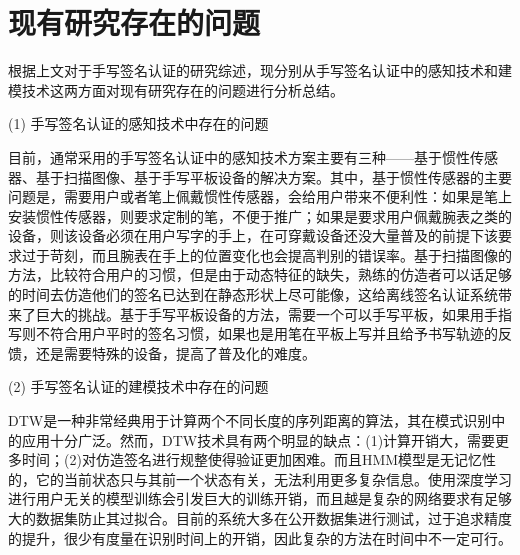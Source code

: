 \section{现有研究存在的问题}
根据上文对于手写签名认证的研究综述，现分别从手写签名认证中的感知技术和建模技术这两方面对现有研究存在的问题进行分析总结。

(1) 手写签名认证的感知技术中存在的问题

目前，通常采用的手写签名认证中的感知技术方案主要有三种——基于惯性传感器、基于扫描图像、基于手写平板设备的解决方案。其中，基于惯性传感器的主要问题是，需要用户或者笔上佩戴惯性传感器，会给用户带来不便利性：如果是笔上安装惯性传感器，则要求定制的笔，不便于推广；如果是要求用户佩戴腕表之类的设备，则该设备必须在用户写字的手上，在可穿戴设备还没大量普及的前提下该要求过于苛刻，而且腕表在手上的位置变化也会提高判别的错误率。基于扫描图像的方法，比较符合用户的习惯，但是由于动态特征的缺失，熟练的仿造者可以话足够的时间去仿造他们的签名已达到在静态形状上尽可能像，这给离线签名认证系统带来了巨大的挑战。基于手写平板设备的方法，需要一个可以手写平板，如果用手指写则不符合用户平时的签名习惯，如果也是用笔在平板上写并且给予书写轨迹的反馈，还是需要特殊的设备，提高了普及化的难度。

(2) 手写签名认证的建模技术中存在的问题

DTW是一种非常经典用于计算两个不同长度的序列距离的算法，其在模式识别中的应用十分广泛。然而，DTW技术具有两个明显的缺点：(1)计算开销大，需要更多时间；(2)对仿造签名进行规整使得验证更加困难。而且HMM模型是无记忆性的，它的当前状态只与其前一个状态有关，无法利用更多复杂信息。使用深度学习进行用户无关的模型训练会引发巨大的训练开销，而且越是复杂的网络要求有足够大的数据集防止其过拟合。目前的系统大多在公开数据集进行测试，过于追求精度的提升，很少有度量在识别时间上的开销，因此复杂的方法在时间中不一定可行。

